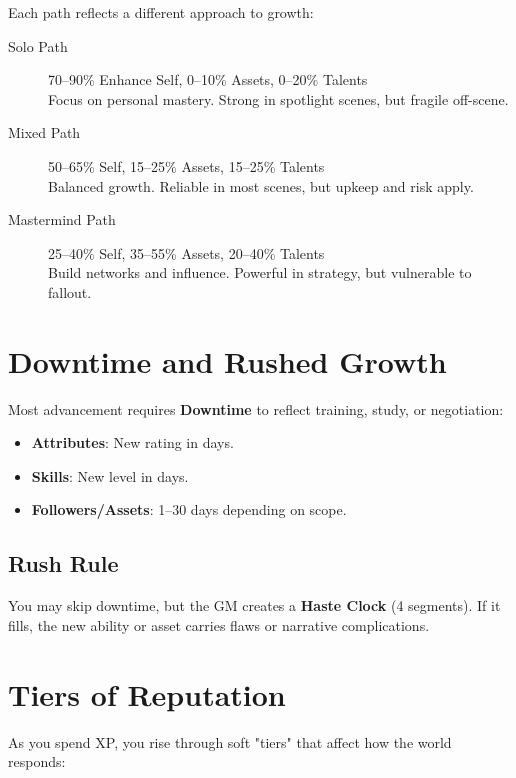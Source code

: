 Each path reflects a different approach to growth:

\begin{description}
  \item[Solo Path] 70–90\% Enhance Self, 0–10\% Assets, 0–20\% Talents \\
    Focus on personal mastery. Strong in spotlight scenes, but fragile off-scene.

  \item[Mixed Path] 50–65\% Self, 15–25\% Assets, 15–25\% Talents \\
    Balanced growth. Reliable in most scenes, but upkeep and risk apply.

  \item[Mastermind Path] 25–40\% Self, 35–55\% Assets, 20–40\% Talents \\
    Build networks and influence. Powerful in strategy, but vulnerable to fallout.
\end{description}

\section{Downtime and Rushed Growth}

Most advancement requires \textbf{Downtime} to reflect training, study, or negotiation:

\begin{itemize}
  \item \textbf{Attributes}: New rating in days.
  \item \textbf{Skills}: New level in days.
  \item \textbf{Followers/Assets}: 1–30 days depending on scope.
\end{itemize}

\subsection*{Rush Rule}

You may skip downtime, but the GM creates a \textbf{Haste Clock} (4 segments). If it fills, the new ability or asset carries flaws or narrative complications.

\section{Tiers of Reputation}

As you spend XP, you rise through soft "tiers" that affect how the world responds:

